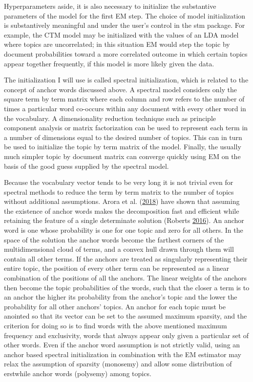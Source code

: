 \documentclass[]{book}
\theoremstyle{definition}
\theoremstyle{definition}
\theoremstyle{definition}
\theoremstyle{remark}
\begin{document}
Hyperparameters aside, it is also necessary to initialize the
substantive parameters of the model for the first EM step. The choice of
model initialization is substantively meaningful and under the user's
control in the stm package. For example, the CTM model may be
initialized with the values of an LDA model where topics are
uncorrelated; in this situation EM would step the topic by document
probabilities toward a more correlated outcome in which certain topics
appear together frequently, if this model is more likely given the data.

The initialization I will use is called spectral initialization, which
is related to the concept of anchor words discussed above. A spectral
model considers only the square term by term matrix where each column
and row refers to the number of times a particular word co-occurs within
any document with every other word in the vocabulary. A dimensionality
reduction technique such as principle component analysis or matrix
factorization can be used to represent each term in a number of
dimensions equal to the desired number of topics. This can in turn be
used to initialize the topic by term matrix of the model. Finally, the
usually much simpler topic by document matrix can converge quickly using
EM on the basis of the good guess supplied by the spectral model.

Because the vocabulary vector tends to be very long it is not trivial
even for spectral methods to reduce the term by term matrix to the
number of topics without additional assumptions. Arora et al.
(\protect\hyperlink{ref-Arora2018Learning}{2018}) have shown that
assuming the existence of anchor words makes the decomposition fast and
efficient while retaining the feature of a single determinate solution
(Roberts \protect\hyperlink{ref-Roberts2016Navigating}{2016}). An anchor
word is one whose probability is one for one topic and zero for all
others. In the space of the solution the anchor words become the
farthest corners of the multidimensional cloud of terms, and a convex
hull drawn through them will contain all other terms. If the anchors are
treated as singularly representing their entire topic, the position of
every other term can be represented as a linear combination of the
positions of all the anchors. The linear weights of the anchors then
become the topic probabilities of the words, such that the closer a term
is to an anchor the higher its probability from the anchor's topic and
the lower the probability for all other anchors' topics. An anchor for
each topic must be anointed so that its vector can be set to the assumed
maximum sparsity, and the criterion for doing so is to find words with
the above mentioned maximum frequency and exclusivity, words that always
appear only given a particular set of other words. Even if the anchor
word assumption is not strictly valid, using an anchor based spectral
initialization in combination with the EM estimator may relax the
assumption of sparsity (monosemy) and allow some distribution of
erstwhile anchor words (polysemy) among topics.
\end{document}
